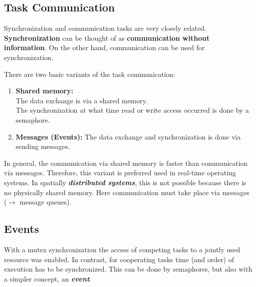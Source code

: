 
\subsection{Task Communication}

Synchronization and communication tasks are very closely related. \textbf{Synchronization} can be thought of as\textbf{ communication without information}. On the other hand, communication can be used for synchronization.\\


There are two basic variants of the task communication:

\begin{enumerate}
	\item  \textbf{Shared memory: } \\
	The data exchange is via a shared memory.\\
	The synchronization at what time read or write access occurred is done by a semaphore.
	\item  \textbf{Messages (Events): }The data exchange and synchronization is done via sending messages.
\end{enumerate}

In general, the communication via shared memory is faster than communication via messages. Therefore, this variant is preferred used in real-time operating systems. In spatially \textbf{\textit{distributed systems}}, this is not possible because there is no physically shared memory. Here communication must take place via messages ($\rightarrow$ message queues).
\newpage
\subsection{Events}

With a mutex synchronization the access of competing tasks to a jointly used resource was enabled. In contrast, for cooperating tasks time (and order) of execution has to be synchronized. This can be done by semaphores, but also with a simpler concept, an \textbf{\textit{event}}.\\

